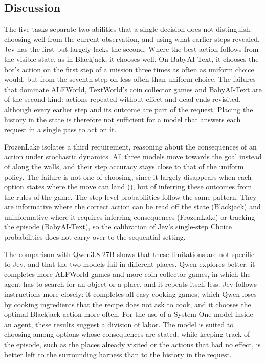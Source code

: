 \documentclass[table]{article}
\begin{document}
\subsection{Discussion}
\label{sec:sequential-discussion}

The five tasks separate two abilities that a single decision does not distinguish: choosing well from the current observation, and using what earlier steps revealed. Jev has the first but largely lacks the second. Where the best action follows from the visible state, as in Blackjack, it chooses well. On BabyAI-Text, it chooses the bot's action on the first step of a mission three times as often as uniform choice would, but from the seventh step on less often than uniform choice. The failures that dominate ALFWorld, TextWorld's coin collector games and BabyAI-Text are of the second kind: actions repeated without effect and dead ends revisited, although every earlier step and its outcome are part of the request. Placing the history in the state is therefore not sufficient for a model that answers each request in a single pass to act on it.

FrozenLake isolates a third requirement, reasoning about the consequences of an action under stochastic dynamics. All three models move towards the goal instead of along the walls, and their step accuracy stays close to that of the uniform policy. The failure is not one of choosing, since it largely disappears when each option states where the move can land (), but of inferring these outcomes from the rules of the game. The step-level probabilities follow the same pattern. They are informative where the correct action can be read off the state (Blackjack) and uninformative where it requires inferring consequences (FrozenLake) or tracking the episode (BabyAI-Text), so the calibration of Jev's single-step Choice probabilities does not carry over to the sequential setting.

The comparison with Qwen3.8-27B shows that these limitations are not specific to Jev, and that the two models fail in different places. Qwen explores better: it completes more ALFWorld games and more coin collector games, in which the agent has to search for an object or a place, and it repeats itself less. Jev follows instructions more closely: it completes all easy cooking games, which Qwen loses by cooking ingredients that the recipe does not ask to cook, and it chooses the optimal Blackjack action more often. For the use of a System One model inside an agent, these results suggest a division of labor. The model is suited to choosing among options whose consequences are stated, while keeping track of the episode, such as the places already visited or the actions that had no effect, is better left to the surrounding harness than to the history in the request.
\end{document}
